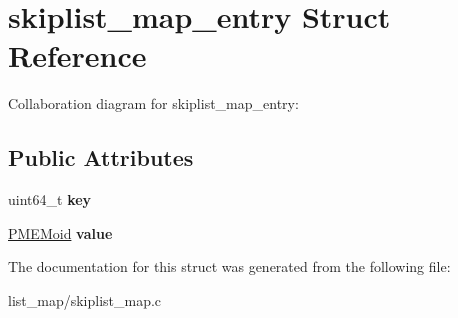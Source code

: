 \hypertarget{structskiplist__map__entry}{}\section{skiplist\+\_\+map\+\_\+entry Struct Reference}
\label{structskiplist__map__entry}


Collaboration diagram for skiplist\+\_\+map\+\_\+entry\+:
\subsection*{Public Attributes}
\begin{DoxyCompactItemize}
\item 
\mbox{\label{structskiplist__map__entry_afe14abf59441e4b5ddc810b1375bf997}} 
uint64\+\_\+t {\bfseries key}
\item 
\mbox{\label{structskiplist__map__entry_a6e5bd75c779b4ba807fbf8d46e0cfd65}} 
\hyperlink{structpmemoid}{P\+M\+E\+Moid} {\bfseries value}
\end{DoxyCompactItemize}


The documentation for this struct was generated from the following file\+:\begin{DoxyCompactItemize}
\item 
list\+\_\+map/skiplist\+\_\+map.\+c\end{DoxyCompactItemize}
